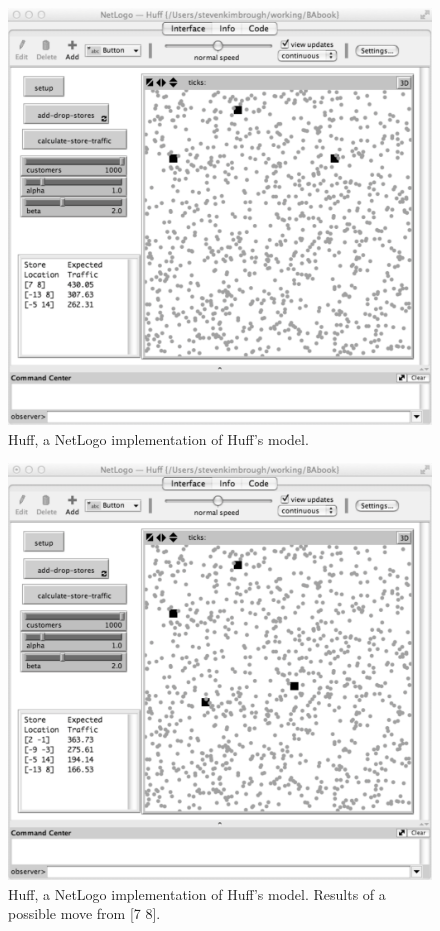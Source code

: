 \begin{figure}[htbp] %
   \centering
   \includegraphics[width=\textwidth]{figures/HuffCase3Start.pdf}  
   \caption{Huff, a NetLogo implementation of Huff's model.} %
   \label{fig:huffnlogo_original_3}
\end{figure}



\begin{figure}[htbp] %
   \centering
   \includegraphics[width=\textwidth]{figures/HuffMove1.pdf}  
   \caption{Huff, a NetLogo implementation of Huff's model. Results of a possible move from [7 8].} %
   \label{fig:HuffMove1pdf}
\end{figure}



